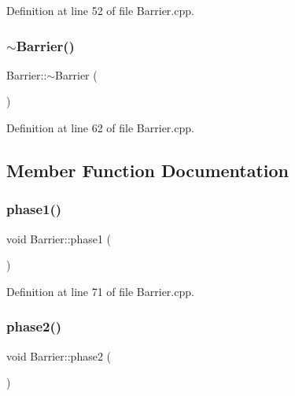 Definition at line 52 of file Barrier.\+cpp.

\mbox{\label{class_barrier_a401f40e73302009b305904ffc7825304}} 
\subsubsection{\texorpdfstring{$\sim$\+Barrier()}{~Barrier()}}
{\footnotesize\ttfamily Barrier\+::$\sim$\+Barrier (\begin{DoxyParamCaption}{ }\end{DoxyParamCaption})\hspace{0.3cm}{\ttfamily [virtual]}}



Definition at line 62 of file Barrier.\+cpp.



\subsection{Member Function Documentation}
\mbox{\label{class_barrier_aef1a70f9dfdaa5f0a10274a46a040f8d}} 
\subsubsection{\texorpdfstring{phase1()}{phase1()}}
{\footnotesize\ttfamily void Barrier\+::phase1 (\begin{DoxyParamCaption}{ }\end{DoxyParamCaption})}



Definition at line 71 of file Barrier.\+cpp.

\mbox{\label{class_barrier_ac91842c7f750131e80a037a02feb5486}} 
\subsubsection{\texorpdfstring{phase2()}{phase2()}}
{\footnotesize\ttfamily void Barrier\+::phase2 (\begin{DoxyParamCaption}{ }\end{DoxyParamCaption})}



